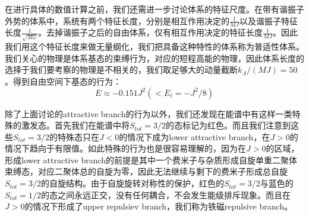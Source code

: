 在进行具体的数值计算之前，我们还需进一步讨论体系的特征尺度。在带有谐振子外势的体系中，系统有两个特征长度，分别是相互作用决定的$\frac{1}{MJ}$以及谐振子特征长度$\frac{1}{\sqrt{M\omega}}$。去掉谐振子之后的自由体系，仅有相互作用决定的特征长度$\frac{1}{MJ}$。因此我们用这个特征长度来做无量纲化，我们把具备这种特性的体系称为普适性体系。我们关心的物理是体系基态的束缚行为，对应的短程高能的物理，因此体系长度的选择于我们要考察的物理是不相关的，我们取足够大的动量截断$k_{\Lambda}/(MJ)=50$。得到自由空间下基态的行为：
\begin{equation}
E \approx-0.151 J^{2}\left(<E_{t}=-J^{2} / 8\right)
\end{equation}

除了上面讨论的attractive branch的行为以外，我们还发现在能谱中有这样一类特殊的激发态。首先我们在能谱中将$S_{tot}=3/2$的态标记为红色。而且我们注意到这些$S_{tot}=3/2$的特殊态只在$J<0$的情况下成为lower attractive branch，在$J>0$的情况下趋向于有限值。如此特殊的行为也是很容易理解的，因为在$J>0$的区域，形成lower attractive branch的前提是其中一个费米子与杂质形成自旋单重二聚体束缚态，对应二聚体总的自旋为零，因此无法继续与剩下的费米子形成总自旋$S_{tot}=3/2$的自旋结构。由于自旋旋转对称性的保护，红色的$S_{tot}=3/2$与蓝色的$S_{tot}=1/2$的态之间永远正交，没有任何耦合，不会发生能级排斥现象。而且在$J>0$的情况下形成了upper repulsiev branch，我们称为铁磁repulsive branch。

